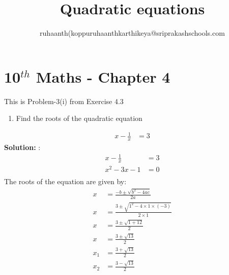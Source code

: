 \documentclass[12pt]{article}
\title{Quadratic equations}
\author{ruhaanth(koppuruhaanthkarthikeya@sriprakashschools.com}
\newcommand{\solution}{\noindent \textbf{Solution: }}
\begin{document}
\maketitle
\section*{10$^{th}$ Maths - Chapter 4}
This is Problem-3(i) from Exercise 4.3\\
\begin{enumerate}
    \item Find the roots of the quadratic equation\\
\end{enumerate}

\begin{align}
x-\frac{1}{x} &= 3
\end{align}
\solution:\\
\begin{align}
x-\frac{1}{x} &= 3\\
x^2-3x-1 &=0\\
\end{align}
The roots of the equation are given by:
\begin{align}
x &=\frac{-b\pm\sqrt{b^2-4ac}}{2a}\\
x &=\frac{3\pm\sqrt{1^2-4 \times 1\times(-3)}}{2 \times 1}\\
x &=\frac{3\pm\sqrt{1+12}}{2}\\
x &=\frac{3\pm\sqrt{13}}{2}\\
x_1 &=\frac{3+\sqrt{13}}{2}\\
x_2 &=\frac{3-\sqrt{13}}{2}\\
\end{align}
\end{document}
